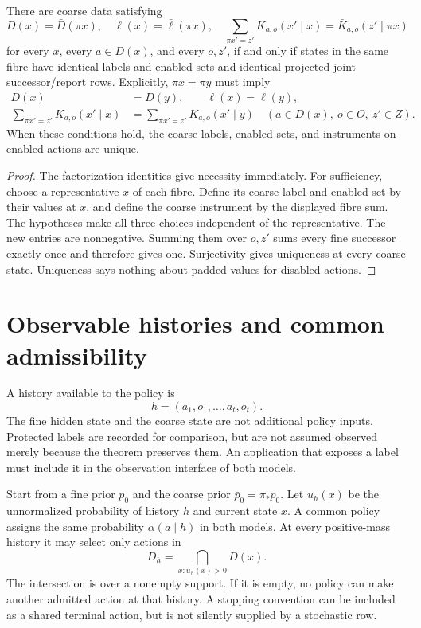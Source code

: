\begin{theorem}\label{r:joint-quotient}
There are coarse data satisfying
\[
 D(x)=\bar D(\pi x),\quad \ell(x)=\bar\ell(\pi x),\quad
 \sum_{\pi x'=z'}K_{a,o}(x'\mid x)=\bar K_{a,o}(z'\mid\pi x)
\]
for every $x$, every $a\in D(x)$, and every $o,z'$, if and only if states in the same fibre have identical labels and enabled sets and identical projected joint successor/report rows. Explicitly, $\pi x=\pi y$ must imply
\begin{align}
 D(x)&=D(y),\qquad \ell(x)=\ell(y),\label{eq:fibre-legal}\\
 \sum_{\pi x'=z'}K_{a,o}(x'\mid x)
 &=\sum_{\pi x'=z'}K_{a,o}(x'\mid y)
 \quad(a\in D(x),\ o\in O,\ z'\in Z).\label{eq:fibre-joint}
\end{align}
When these conditions hold, the coarse labels, enabled sets, and instruments on enabled actions are unique.
\end{theorem}
\begin{proof}
The factorization identities give necessity immediately. For sufficiency, choose a representative $x$ of each fibre. Define its coarse label and enabled set by their values at $x$, and define the coarse instrument by the displayed fibre sum. The hypotheses make all three choices independent of the representative. The new entries are nonnegative. Summing them over $o,z'$ sums every fine successor exactly once and therefore gives one. Surjectivity gives uniqueness at every coarse state. Uniqueness says nothing about padded values for disabled actions.
\end{proof}

\section{Observable histories and common admissibility}
A history available to the policy is
\[
 h=(a_1,o_1,\ldots,a_t,o_t).
\]
The fine hidden state and the coarse state are not additional policy inputs. Protected labels are recorded for comparison, but are not assumed observed merely because the theorem preserves them. An application that exposes a label must include it in the observation interface of both models.

Start from a fine prior $p_0$ and the coarse prior $\bar p_0=\pi_*p_0$. Let $u_h(x)$ be the unnormalized probability of history $h$ and current state $x$. A common policy assigns the same probability $\alpha(a\mid h)$ in both models. At every positive-mass history it may select only actions in
\[
 D_h=\bigcap_{x:u_h(x)>0}D(x).
\]
The intersection is over a nonempty support. If it is empty, no policy can make another admitted action at that history. A stopping convention can be included as a shared terminal action, but is not silently supplied by a stochastic row.


